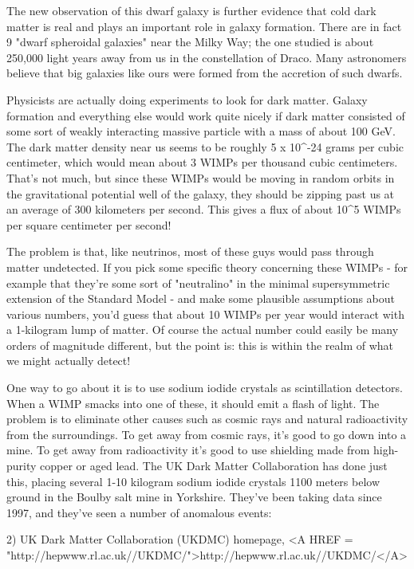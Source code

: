 The new observation of this dwarf galaxy is further evidence that cold
dark matter is real and plays an important role in galaxy formation.
There are in fact 9 "dwarf spheroidal galaxies" near the Milky Way; 
the one studied is about 250,000 light years away from us in the
constellation of Draco.  Many astronomers believe that big galaxies 
like ours were formed from the accretion of such dwarfs.

Physicists are actually doing experiments to look for dark matter.
Galaxy formation and everything else would work quite nicely if dark
matter consisted of some sort of weakly interacting massive particle
with a mass of about 100 GeV.  The dark matter density near us seems to
be roughly 5 x 10^{-24} grams per cubic centimeter, which would mean
about 3 WIMPs per thousand cubic centimeters.  That's not much, but 
since these WIMPs would be moving in random orbits in the gravitational 
potential well of
the galaxy, they should be zipping past us at an average of 300 kilometers
per second.  This gives a flux of about 10^{5} WIMPs per square 
centimeter per second!

The problem is that, like neutrinos, most of these guys would pass
through matter undetected.  If you pick some specific theory concerning
these WIMPs - for example that they're some sort of "neutralino" 
in the
minimal supersymmetric extension of the Standard Model - and make some
plausible assumptions about various numbers, you'd guess that about 10
WIMPs per year would interact with a 1-kilogram lump of matter.  Of
course the actual number could easily be many orders of magnitude
different, but the point is: this is within the realm of what we might
actually detect!

One way to go about it is to use sodium iodide crystals as scintillation
detectors.  When a WIMP smacks into one of these, it should emit a
flash of light.  The problem is to eliminate other causes such as 
cosmic rays and natural radioactivity from the surroundings.  To get 
away from cosmic rays, it's good to go down into a mine.  To get away 
from radioactivity it's good to use shielding made from high-purity 
copper or aged lead.  The UK Dark Matter Collaboration has done just 
this, placing several 1-10 kilogram sodium iodide crystals 1100 meters 
below ground in the Boulby salt mine in Yorkshire.  They've been taking
data since 1997, and they've seen a number of anomalous events:

2) UK Dark Matter Collaboration (UKDMC) homepage,
<A HREF = "http://hepwww.rl.ac.uk//UKDMC/">http://hepwww.rl.ac.uk//UKDMC/</A>

